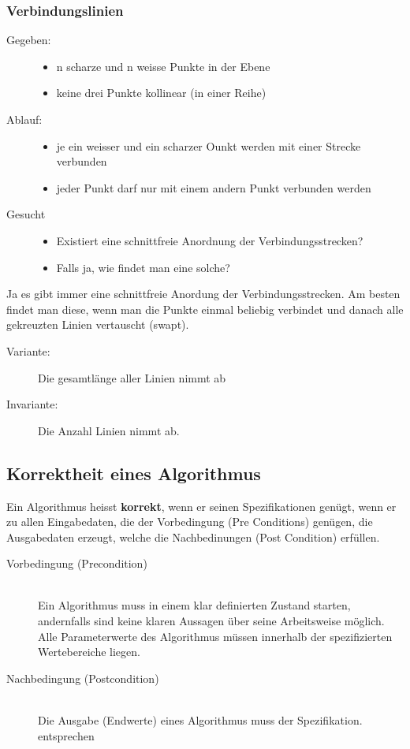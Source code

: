 \documentclass[a4paper,10pt]{article}
\newcommand{\Bold}[1]{\textbf{#1}} %
\begin{document}
\subsubsection{Verbindungslinien}
\begin{description}
	\item[Gegeben:] \hfill
		\begin{itemize}
			\item n scharze und n weisse Punkte in der Ebene
			\item keine drei Punkte kollinear (in einer Reihe)
		\end{itemize}
	\item[Ablauf:] \hfill
		\begin{itemize}
			\item je ein weisser und ein scharzer Ounkt werden mit einer Strecke verbunden
			\item jeder Punkt darf nur mit einem andern Punkt verbunden werden
		\end{itemize}
	\item[Gesucht] \hfill
		\begin{itemize}
			\item Existiert eine schnittfreie Anordnung der Verbindungsstrecken?
			\item Falls ja, wie findet man eine solche?
		\end{itemize}
\end{description}
Ja es gibt immer eine schnittfreie Anordung der Verbindungsstrecken. Am besten findet man diese, wenn man die Punkte einmal beliebig verbindet und danach alle gekreuzten Linien vertauscht (swapt).

\begin{description}
	\item[Variante:] Die gesamtl\"ange aller Linien nimmt ab
	\item[Invariante:] Die Anzahl Linien nimmt ab.
\end{description}

\subsection{Korrektheit eines Algorithmus}
Ein Algorithmus heisst \Bold {korrekt}, wenn er seinen Spezifikationen gen\"ugt, wenn er zu allen Eingabedaten, die der Vorbedingung (Pre Conditions) gen\"ugen, die Ausgabedaten erzeugt, welche die Nachbedinungen (Post Condition) erf\"ullen. 
\begin{description}
	\item[Vorbedingung (Precondition)] \hfill \\
		Ein Algorithmus muss in einem klar definierten Zustand starten, andernfalls sind keine klaren Aussagen \"uber seine Arbeitsweise m\"oglich. Alle Parameterwerte des Algorithmus m\"ussen innerhalb der spezifizierten Wertebereiche liegen.
	\item[Nachbedingung (Postcondition)] \hfill \\
		Die Ausgabe (Endwerte) eines Algorithmus muss der Spezifikation.
entsprechen
\end{description}
\end{document}
